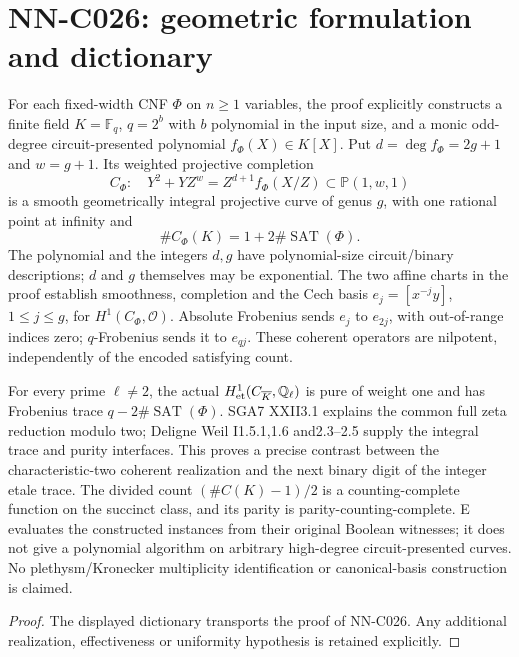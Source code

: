 \section{NN-C026: geometric formulation and dictionary}
\begin{geometricstatement}[NN-C026]
For each fixed-width CNF $\Phi$ on $n\geq1$ variables, the proof explicitly constructs a finite field $K=\mathbb F_q$, $q=2^b$ with $b$ polynomial in the input size, and a monic odd-degree circuit-presented polynomial $f_\Phi(X)\in K[X]$. Put $d=\deg f_\Phi=2g+1$ and $w=g+1$. Its weighted projective completion
\[
 C_\Phi:\quad Y^2+YZ^w=Z^{d+1}f_\Phi(X/Z)
       \subset\mathbb P(1,w,1)
\]
is a smooth geometrically integral projective curve of genus $g$, with one rational point at infinity and
\[
 \#C_\Phi(K)=1+2\#\operatorname{SAT}(\Phi).
\]
The polynomial and the integers $d,g$ have polynomial-size circuit/binary descriptions; $d$ and $g$ themselves may be exponential. The two affine charts in the proof establish smoothness, completion and the Cech basis $e_j=[x^{-j}y]$, $1\leq j\leq g$, for $H^1(C_\Phi,\mathcal O)$. Absolute Frobenius sends $e_j$ to $e_{2j}$, with out-of-range indices zero; $q$-Frobenius sends it to $e_{qj}$. These coherent operators are nilpotent, independently of the encoded satisfying count.

For every prime $\ell\ne2$, the actual $H^1_{\rm et}(C_{\overline K},\mathbb Q_\ell)$ is pure of weight one and has Frobenius trace $q-2\#\operatorname{SAT}(\Phi)$. SGA7 XXII3.1 explains the common full zeta reduction modulo two; Deligne Weil I1.5.1,1.6 and2.3--2.5 supply the integral trace and purity interfaces. This proves a precise contrast between the characteristic-two coherent realization and the next binary digit of the integer etale trace. The divided count $(\#C(K)-1)/2$ is a counting-complete function on the succinct class, and its parity is parity-counting-complete. E evaluates the constructed instances from their original Boolean witnesses; it does not give a polynomial algorithm on arbitrary high-degree circuit-presented curves. No plethysm/Kronecker multiplicity identification or canonical-basis construction is claimed.
\end{geometricstatement}
\begin{proof} The displayed dictionary transports the proof of NN-C026. Any additional realization, effectiveness or uniformity hypothesis is retained explicitly.\end{proof}


